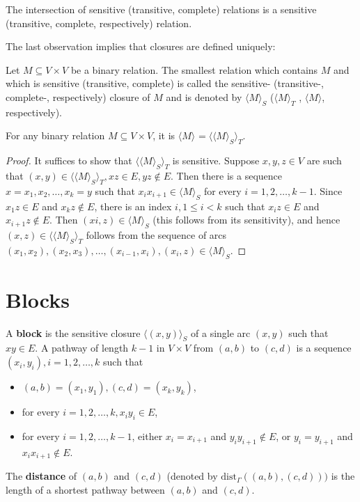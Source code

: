 \begin{observ}
	The intersection of sensitive (transitive, complete) relations is a sensitive (transitive, complete, respectively) relation.
\end{observ}

The last observation implies that closures are defined uniquely:

\begin{defn}
	Let $M \subseteq V \times V$ be a binary relation. The smallest relation which contains $M$ and which is sensitive (transitive, complete) is called the sensitive- (transitive-, complete-, respectively) closure of $M$ and is denoted by $\langle M \rangle_{S}$ ($\langle M \rangle_{T}$ , $\langle M \rangle$, respectively).
\end{defn}

\begin{lemma}
	For any binary relation $M \subseteq V \times V$, it is $\langle M \rangle_{} = \langle\langle M \rangle_{S}\rangle_{T}$.
\end{lemma}

\begin{proof}
	It suffices to show that $\langle\langle M \rangle_{S}\rangle_{T}$ is sensitive. Suppose $x, y, z \in V$ are such that $(x, y) \in \langle\langle M \rangle_{S}\rangle_{T}, xz \in E, yz \notin E$. Then there is a sequence $x = x_1 , x_2 , \dots, x_k = y$ such that $x_i x_{i+1} \in \langle M \rangle_{S}$ for every $i = 1, 2, \dots, k-1$. Since $x_1 z \in E$ and $x_k z \notin E$, there is an index $i, 1 \leq i < k$ such that $x_i z \in E$ and $x_{i+1} z \notin E$. Then $(xi , z) \in \langle M \rangle_S$ (this follows from its sensitivity), and hence $(x, z) \in \langle\langle M \rangle_{S}\rangle_{T}$	follows from the sequence of arcs $(x_1 , x_2), (x_2 , x_3), \dots, (x_{i-1} , x_i), (x_i , z) \in \langle M \rangle_{S}$.
\end{proof}

\section{Blocks}

\begin{defn}
	A \textbf{block} is the sensitive closure $\langle(x, y)\rangle_S$ of a single arc $(x, y)$ such that $xy \in E$. A pathway of length $k - 1$ in $V \times V$ from $(a, b)$ to $(c, d)$ is a sequence $(x_i, y_i), i = 1, 2, \dots, k$ such that
	
	\begin{itemize}
		\item $(a,b) = (x_1, y_1), (c,d) = (x_k, y_k)$,
		\item for every $i = 1, 2, \dots, k, x_i y_i \in E$,
		\item for every $i = 1, 2, \dots, k - 1$, either $x_i = x_{i+1}$ and $y_i y_{i+1} \notin E$, or $y_i = y_{i+1}$ and $x_i x_{i+1} \notin E$.
	\end{itemize}
	
	The \textbf{distance} of $(a, b)$ and $(c, d)$ (denoted by $\text{dist}_\Gamma ((a, b), (c, d)))$ is the length of a shortest pathway	between $(a, b)$ and $(c, d)$.
\end{defn}

